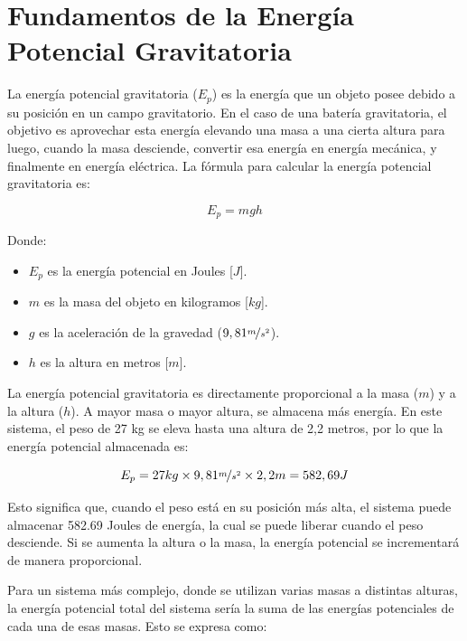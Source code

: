     \section{Fundamentos de la Energía Potencial Gravitatoria}
    
        La energía potencial gravitatoria ($E_p$) es la energía que un objeto posee debido a su posición en un campo gravitatorio. En el caso de una batería gravitatoria, el objetivo es aprovechar esta energía elevando una masa a una cierta altura para luego, cuando la masa desciende, convertir esa energía en energía mecánica, y finalmente en energía eléctrica. La fórmula para calcular la energía potencial gravitatoria es:\par
        
        \begin{equation}
            E_p = mgh
        \end{equation}
        
        Donde:\par
        
        \begin{itemize} [label=•]
            \setlength{\itemindent}{1.5em}
            
            \item $E_p$ es la energía potencial en Joules [$J$].
            \item $m$ es la masa del objeto en kilogramos [$kg$].
            \item $g$ es la aceleración de la gravedad ($9,81 \nicefrac{m}{s^2}$).
            \item $h$ es la altura en metros [$m$].
        \end{itemize}
        
        La energía potencial gravitatoria es directamente proporcional a la masa ($m$) y a la altura ($h$). A mayor masa o mayor altura, se almacena más energía. En este sistema, el peso de 27 kg se eleva hasta una altura de 2,2 metros, por lo que la energía potencial almacenada es:\par

        \begin{equation}
            E_p = 27kg \times 9,81 \nicefrac{m}{s^2} \times 2,2m = 582,69 J
        \end{equation}
        
        Esto significa que, cuando el peso está en su posición más alta, el sistema puede almacenar 582.69 Joules de energía, la cual se puede liberar cuando el peso desciende. Si se aumenta la altura o la masa, la energía potencial se incrementará de manera proporcional.\par
        Para un sistema más complejo, donde se utilizan varias masas a distintas alturas, la energía potencial total del sistema sería la suma de las energías potenciales de cada una de esas masas. Esto se expresa como:\par
        

